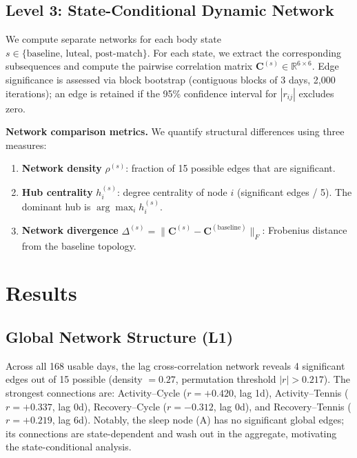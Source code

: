 \documentclass[letterpaper]{article}
\begin{document}
\subsection{Level 3: State-Conditional Dynamic Network}

We compute separate networks for each body state $s \in \{\text{baseline, luteal, post-match}\}$. For each state, we extract the corresponding subsequences and compute the pairwise correlation matrix $\mathbf{C}^{(s)} \in \mathbb{R}^{6 \times 6}$. Edge significance is assessed via block bootstrap (contiguous blocks of 3 days, 2{,}000 iterations); an edge is retained if the 95\% confidence interval for $|r_{ij}|$ excludes zero.

\textbf{Network comparison metrics.} We quantify structural differences using three measures:

\begin{enumerate}
\item \textbf{Network density} $\rho^{(s)}$: fraction of 15 possible edges that are significant.
\item \textbf{Hub centrality} $h^{(s)}_i$: degree centrality of node $i$ (significant edges / 5). The dominant hub is $\arg\max_i h^{(s)}_i$.
\item \textbf{Network divergence} $\Delta^{(s)} = \|\mathbf{C}^{(s)} - \mathbf{C}^{(\text{baseline})}\|_F$: Frobenius distance from the baseline topology.
\end{enumerate}

\section{Results}

\subsection{Global Network Structure (L1)}

Across all 168 usable days, the lag cross-correlation network reveals 4 significant edges out of 15 possible (density $= 0.27$, permutation threshold $|r| > 0.217$). The strongest connections are: Activity--Cycle ($r = +0.420$, lag 1d), Activity--Tennis ($r = +0.337$, lag 0d), Recovery--Cycle ($r = -0.312$, lag 0d), and Recovery--Tennis ($r = +0.219$, lag 6d). Notably, the sleep node (A) has no significant global edges; its connections are state-dependent and wash out in the aggregate, motivating the state-conditional analysis.
\end{document}
